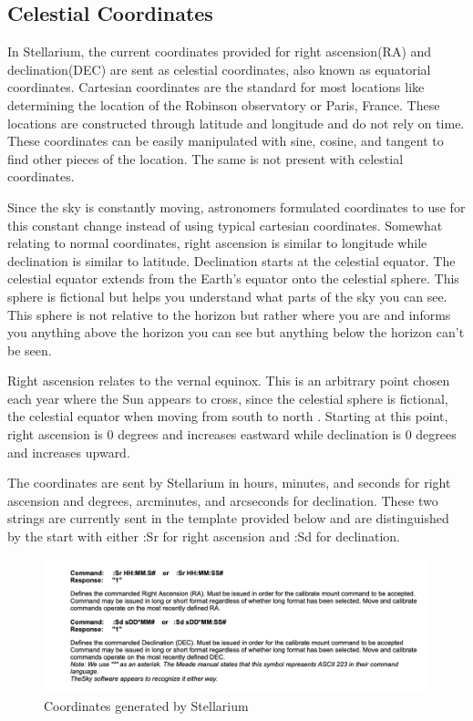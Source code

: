 \documentclass[12pt]{article}
\begin{document}
\subsection{Celestial Coordinates}

In Stellarium, the current coordinates provided for right ascension(RA) and declination(DEC) are sent as celestial coordinates, also known as equatorial coordinates. Cartesian coordinates are the standard for most locations like determining the location of the Robinson observatory or Paris, France. These locations are constructed through latitude and longitude and do not rely on time. These coordinates can be easily manipulated with sine, cosine, and tangent to find other pieces of the location. The same is not present with celestial coordinates.

Since the sky is constantly moving, astronomers formulated coordinates to use for this constant change instead of using typical cartesian coordinates. Somewhat relating to normal coordinates, right ascension is similar to longitude while declination is similar to latitude. Declination starts at the celestial equator. The celestial equator extends from the Earth’s equator onto the celestial sphere. This sphere is fictional but helps you understand what parts of the sky you can see. This sphere is not relative to the horizon but rather where you are and informs you anything above the horizon you can see but anything below the horizon can’t be seen.

Right ascension relates to the vernal equinox. This is an arbitrary point chosen each year where the Sun appears to cross, since the celestial sphere is fictional, the celestial equator when moving from south to north \cite{celestial}. Starting at this point, right ascension is 0 degrees and increases eastward while declination is 0 degrees and increases upward.

The coordinates are sent by Stellarium in hours, minutes, and seconds for right ascension and degrees, arcminutes, and arcseconds for declination. These two strings are currently sent in the template provided below and are distinguished by the start with either :Sr for right ascension and :Sd for declination.

\begin{figure}[h]
  \centering
  \includegraphics[width=\linewidth]{convStell}
  \caption{Coordinates generated by Stellarium}
  \label{fig:conStell}
\end{figure}
\end{document}
